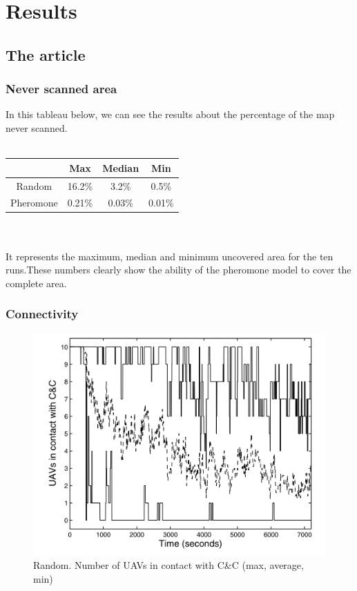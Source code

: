 \chapter{Results}

\section{The article}

\subsection{Never scanned area}

In this tableau below, we can see the results about the percentage of the map never scanned.\\\\

\begin{tabular}{|c|c|c|c|}
\hline
	      & Max & Median & Min \\
	      \hline
	Random & 16.2\% & 3.2\% & 0.5\% \\
	\hline
	Pheromone & 0.21\% & 0.03\% & 0.01\% \\
	\hline
\end{tabular}
\\\\
It represents  the maximum, median and minimum uncovered area for the ten runs.These numbers  clearly  show  the  ability  of  the  pheromone 
model to cover the complete area. 

\subsection{Connectivity}

\begin{figure}[h]
\caption{\label{randomconnect} Random. Number of UAVs in contact with C\&C (max, average, min)}
   \includegraphics{../images/random_resultat_connectivite.png}
\end{figure}

